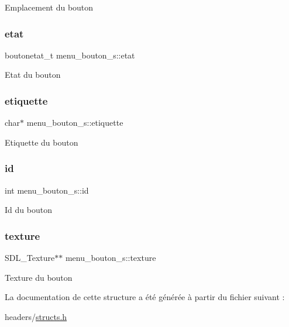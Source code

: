 Emplacement du bouton \mbox{\label{structmenu__bouton__s_a114cea39e43705c936e2bc3c986c67df}} 
\subsubsection{\texorpdfstring{etat}{etat}}
{\footnotesize\ttfamily boutonetat\+\_\+t menu\+\_\+bouton\+\_\+s\+::etat}

Etat du bouton \mbox{\label{structmenu__bouton__s_a1cfed146f9b6f75ef3fe35b65515c44d}} 
\subsubsection{\texorpdfstring{etiquette}{etiquette}}
{\footnotesize\ttfamily char$\ast$ menu\+\_\+bouton\+\_\+s\+::etiquette}

Etiquette du bouton \mbox{\label{structmenu__bouton__s_a16f9dfcf7485d53f26072b6a3503881f}} 
\subsubsection{\texorpdfstring{id}{id}}
{\footnotesize\ttfamily int menu\+\_\+bouton\+\_\+s\+::id}

Id du bouton \mbox{\label{structmenu__bouton__s_abfd7c9a2dd215a5abf19e9f6994d46f5}} 
\subsubsection{\texorpdfstring{texture}{texture}}
{\footnotesize\ttfamily S\+D\+L\+\_\+\+Texture$\ast$$\ast$ menu\+\_\+bouton\+\_\+s\+::texture}

Texture du bouton 

La documentation de cette structure a été générée à partir du fichier suivant \+:\begin{DoxyCompactItemize}
\item 
headers/\hyperlink{structs_8h}{structs.\+h}\end{DoxyCompactItemize}
